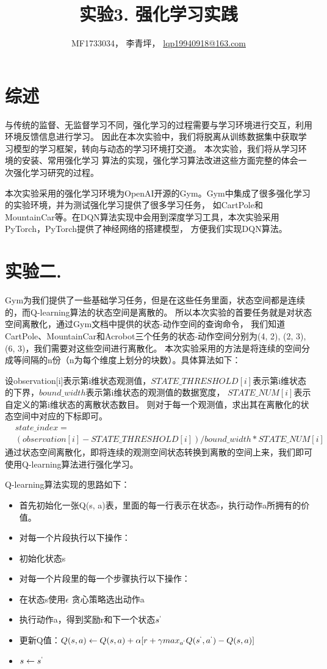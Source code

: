 \documentclass[a4paper,UTF8]{article}
\theoremstyle{definition}
\begin{document}
\title{实验3. 强化学习实践}
\author{MF1733034， 李青坪， \url{lqp19940918@163.com}}
\maketitle

\section*{综述}
与传统的监督、无监督学习不同，强化学习的过程需要与学习环境进行交互，利用环境反馈信息进行学习。
因此在本次实验中，我们将脱离从训练数据集中获取学习模型的学习框架，转向与动态的学习环境打交道。
本次实验，我们将从学习环境的安装、常用强化学习 算法的实现，强化学习算法改进这些方面完整的体会一次强化学习研究的过程。

本次实验采用的强化学习环境为OpenAI开源的Gym。Gym中集成了很多强化学习的实验环境，并为测试强化学习提供了很多学习任务，
如CartPole和MountainCar等。在DQN算法实现中会用到深度学习工具，本次实验采用PyTorch，PyTorch提供了神经网络的搭建模型，
方便我们实现DQN算法。

\section*{实验二. }
Gym为我们提供了一些基础学习任务，但是在这些任务里面，状态空间都是连续的，而Q-learning算法的状态空间是离散的。
所以本次实验的首要任务就是对状态空间离散化，通过Gym文档中提供的状态-动作空间的查询命令，
我们知道CartPole、MountainCar和Acrobot三个任务的状态-动作空间分别为(4, 2), (2, 3), (6, 3)，我们需要对这些空间进行离散化。
本次实验采用的方法是将连续的空间分成等间隔的n份（n为每个维度上划分的块数）。具体算法如下：

	设observation[i]表示第i维状态观测值，$STATE\_THRESHOLD[i]$表示第i维状态的下界，$bound\_width$表示第i维状态的观测值的数据宽度，
$STATE\_NUM[i]$表示自定义的第i维状态的离散状态数目。
则对于每一个观测值，求出其在离散化的状态空间中对应的下标即可。
\begin{align*}
	&state\_index = \\
	&(observation[i] - STATE\_THRESHOLD[i])/bound\_width * STATE\_NUM[i]
\end{align*}
通过状态空间离散化，即将连续的观测空间状态转换到离散的空间上来，我们即可使用Q-learning算法进行强化学习。

Q-learning算法实现的思路如下：
\begin{itemize}
	\item 首先初始化一张Q(s, a)表，里面的每一行表示在状态s，执行动作a所拥有的价值。
	\item 对每一个片段执行以下操作：
	\item 初始化状态s
	\item 对每一个片段里的每一个步骤执行以下操作：
	\item 在状态s使用$\epsilon$ 贪心策略选出动作a
	\item 执行动作a，得到奖励r和下一个状态$s^`$
	\item 更新Q值：$Q(s, a) \gets Q(s, a) + \alpha [r + \gamma max_{a^`}Q(s^`, a^`) - Q(s, a)]$
	\item $s \gets s^`$
\end{itemize}
\end{document}
